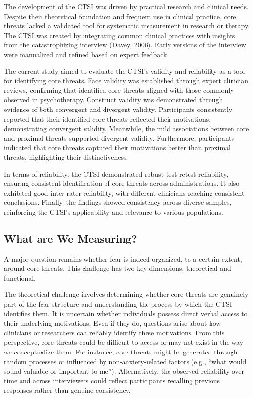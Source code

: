 \documentclass[
  man,floatsintext]{apa7}
\begin{document}
The development of the CTSI was driven by practical research and clinical needs.
Despite their theoretical foundation and frequent use in clinical practice, core threats lacked a validated tool for systematic measurement in research or therapy.
The CTSI was created by integrating common clinical practices with insights from the catastrophizing interview (Davey, 2006).
Early versions of the interview were manualized and refined based on expert feedback.

The current study aimed to evaluate the CTSI's validity and reliability as a tool for identifying core threats.
Face validity was established through expert clinician reviews, confirming that identified core threats aligned with those commonly observed in psychotherapy.
Construct validity was demonstrated through evidence of both convergent and divergent validity.
Participants consistently reported that their identified core threats reflected their motivations, demonstrating convergent validity.
Meanwhile, the mild associations between core and proximal threats supported divergent validity.
Furthermore, participants indicated that core threats captured their motivations better than proximal threats, highlighting their distinctiveness.

In terms of reliability, the CTSI demonstrated robust test-retest reliability, ensuring consistent identification of core threats across administrations.
It also exhibited good inter-rater reliability, with different clinicians reaching consistent conclusions.
Finally, the findings showed consistency across diverse samples, reinforcing the CTSI's applicability and relevance to various populations.

\subsection{What are We Measuring?}\label{what-are-we-measuring}

A major question remains whether fear is indeed organized, to a certain extent, around core threats.
This challenge has two key dimensions: theoretical and functional.

The theoretical challenge involves determining whether core threats are genuinely part of the fear structure and understanding the process by which the CTSI identifies them.
It is uncertain whether individuals possess direct verbal access to their underlying motivations.
Even if they do, questions arise about how clinicians or researchers can reliably identify these motivations.
From this perspective, core threats could be difficult to access or may not exist in the way we conceptualize them.
For instance, core threats might be generated through random processes or influenced by non-anxiety-related factors (e.g., ``what would sound valuable or important to me'').
Alternatively, the observed reliability over time and across interviewers could reflect participants recalling previous responses rather than genuine consistency.
\end{document}
